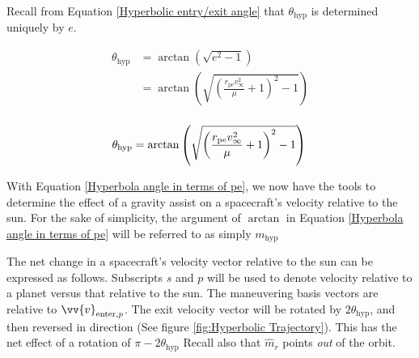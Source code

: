 \documentclass{article}
\begin{document}
Recall from Equation \eqref{Hyperbolic entry/exit angle} that $\theta_\text{hyp}$ is determined uniquely by $e$.

\begin{align*}
    \theta_\text{hyp} & =\arctan\left(\sqrt{e^2-1}\right)                                                \\
                      & =\arctan\left(\sqrt{\left(\frac{r_\text{pe}v_\infty^2}{\mu}+1\right)^2-1}\right) \\
\end{align*}

\begin{equation}\label{Hyperbola angle in terms of pe}
    \theta_\text{hyp}=\arctan\left(\sqrt{\left(\frac{r_\text{pe}v_\infty^2}{\mu}+1\right)^2-1}\right)\\
\end{equation}

With Equation \eqref{Hyperbola angle in terms of pe}, we now have the tools to determine the effect of a gravity assist on a spacecraft's velocity relative to the sun. For the sake of simplicity, the argument of $\arctan$ in Equation \eqref{Hyperbola angle in terms of pe} will be referred to as simply $m_\text{hyp}$

The net change in a spacecraft's velocity vector relative to the sun can be expressed as follows. Subscripts $s$ and $p$ will be used to denote velocity relative to a planet versus that relative to the sun. The maneuvering basis vectors are relative to $\vv{v}_{\text{enter},p}$. The exit velocity vector will be rotated by $2\theta_\text{hyp}$, and then reversed in direction (See figure \ref{fig:Hyperbolic Trajectory}). This has the net effect of a rotation of $\pi-2\theta_\text{hyp}$ Recall also that $\hat{m}_r$ points \textit{out} of the orbit.
\end{document}
